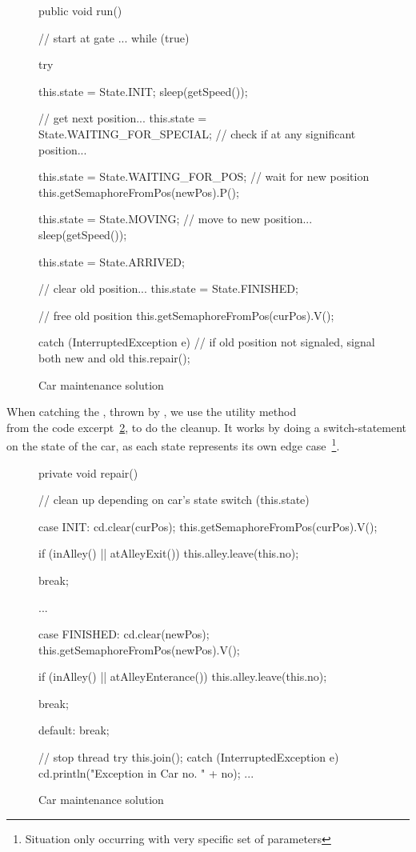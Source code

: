\begin{figure}[H]
  \begin{java}
public void run() { // start at gate
    ...
    while (true) {
        try {
            this.state = State.INIT;
            sleep(getSpeed());

            // get next position...
            this.state = State.WAITING_FOR_SPECIAL;
            // check if at any significant position...

            this.state = State.WAITING_FOR_POS;
            // wait for new position
            this.getSemaphoreFromPos(newPos).P();

            this.state = State.MOVING;
            // move to new position...
            sleep(getSpeed());

            this.state = State.ARRIVED;

            // clear old position...
            this.state = State.FINISHED;

            // free old position
            this.getSemaphoreFromPos(curPos).V();
        } catch (InterruptedException e) {
            // if old position not signaled, signal both new and old
            this.repair();
        }
    }
}
  \end{java}
  \caption{Car maintenance solution}
\label{lst:main-run}
\end{figure}

When catching the , thrown by
, we use the utility method \\
 from the code excerpt~\ref{lst:main-rep}, to do the
cleanup. It works by doing a switch-statement on the state of the car,
as each state represents its own edge case~\footnote{Situation only
  occurring with very specific set of parameters}.

\begin{figure}[H]
  \begin{java}
private void repair() {
    // clean up depending on car's state
    switch (this.state) {
        case INIT:
            cd.clear(curPos);
            this.getSemaphoreFromPos(curPos).V();

            if (inAlley() || atAlleyExit())
                this.alley.leave(this.no);

            break;

        ...

        case FINISHED:
            cd.clear(newPos);
            this.getSemaphoreFromPos(newPos).V();

            if (inAlley() || atAlleyEnterance())
                this.alley.leave(this.no);

            break;

        default:
            break;
    }

    // stop thread
    try {
        this.join();
    } catch (InterruptedException e) {
        cd.println("Exception in Car no. " + no);
        ...
    }
}
  \end{java}
  \caption{Car maintenance solution}
\label{lst:main-rep}
\end{figure}


